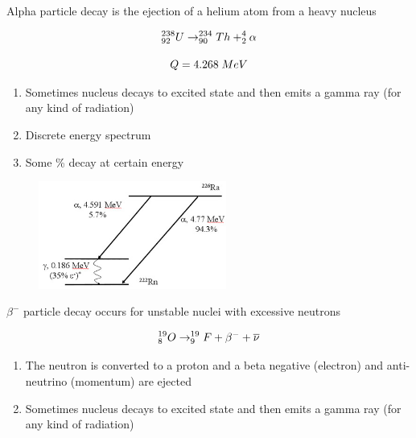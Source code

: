 \documentclass[aspectratio=1610,pdftex,dvipsnames,compress,xcolor={dvipsnames}]{beamer}
\begin{document}
\begin{frame}{Alpha particle decay is the ejection of a helium atom from a heavy nucleus}

    \begin{equation}
        \LARGE
        ^{238}_{92}U \rightarrow ^{234}_{90}Th + ^{4}_{2}\alpha  
    \end{equation}

    \begin{equation}
        \LARGE
        Q = 4.268 \; MeV
    \end{equation}

    \vspace*{\fill}

    \begin{enumerate}[series=outerlist,topsep=0pt,itemsep=21pt,leftmargin=*,label=(\arabic*)]
        \item[]Sometimes nucleus decays to excited state and then emits a gamma ray (for any kind of radiation)
        \item[]Discrete energy spectrum
        \item[]Some \% decay at certain energy
    \end{enumerate}
\end{frame}


\begin{frame}{}
    \begin{figure}
        \centering
        \href{https://courses.ecampus.oregonstate.edu/ne581/three/images/chart32.gif}{\includegraphics[width=0.55\textwidth]{alpha.con.jpg}}
    \end{figure}
\end{frame}


\begin{frame}{$\beta^-$ particle decay occurs for unstable nuclei with excessive neutrons}

    \begin{equation}
        \LARGE
        ^{19}_{8}O \rightarrow ^{19}_{9}F + \beta^{-} + \overline{\nu} 
    \end{equation}

    \vspace*{\fill}

    \begin{enumerate}[series=outerlist,topsep=0pt,itemsep=21pt,leftmargin=*,label=(\arabic*)]
        \item[]The neutron is converted to a proton and a beta negative (electron) and anti-neutrino (momentum) are ejected
        \item[]Sometimes nucleus decays to excited state and then emits a gamma ray (for any kind of radiation)
    \end{enumerate}
\end{frame}
\end{document}

